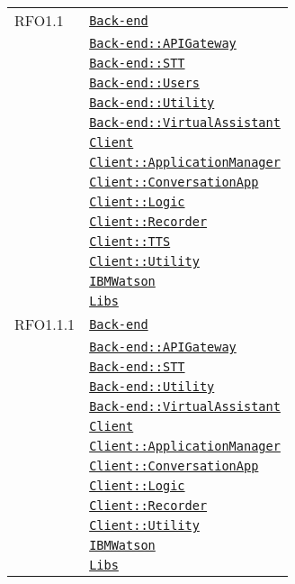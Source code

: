 \begin{longtable}{|>{\centering}m{3cm}|m{10cm}<{\centering}|}
RFO1.1 & \hyperref[Back-end]{\texttt{Back-end}}\\
& \hyperref[Back-end::APIGateway]{\texttt{Back-end::APIGateway}}\\
& \hyperref[Back-end::STT]{\texttt{Back-end::STT}}\\
& \hyperref[Back-end::Users]{\texttt{Back-end::Users}}\\
& \hyperref[Back-end::Utility]{\texttt{Back-end::Utility}}\\
& \hyperref[Back-end::VirtualAssistant]{\texttt{Back-end::VirtualAssistant}}\\
& \hyperref[Client]{\texttt{Client}}\\
& \hyperref[Client::ApplicationManager]{\texttt{Client::ApplicationManager}}\\
& \hyperref[Client::ConversationApp]{\texttt{Client::ConversationApp}}\\
& \hyperref[Client::Logic]{\texttt{Client::Logic}}\\
& \hyperref[Client::Recorder]{\texttt{Client::Recorder}}\\
& \hyperref[Client::TTS]{\texttt{Client::TTS}}\\
& \hyperref[Client::Utility]{\texttt{Client::Utility}}\\
& \hyperref[IBMWatson]{\texttt{IBMWatson}}\\
& \hyperref[Libs]{\texttt{Libs}}\\ \hline

RFO1.1.1 & \hyperref[Back-end]{\texttt{Back-end}}\\
& \hyperref[Back-end::APIGateway]{\texttt{Back-end::APIGateway}}\\
& \hyperref[Back-end::STT]{\texttt{Back-end::STT}}\\
& \hyperref[Back-end::Utility]{\texttt{Back-end::Utility}}\\
& \hyperref[Back-end::VirtualAssistant]{\texttt{Back-end::VirtualAssistant}}\\
& \hyperref[Client]{\texttt{Client}}\\
& \hyperref[Client::ApplicationManager]{\texttt{Client::ApplicationManager}}\\
& \hyperref[Client::ConversationApp]{\texttt{Client::ConversationApp}}\\
& \hyperref[Client::Logic]{\texttt{Client::Logic}}\\
& \hyperref[Client::Recorder]{\texttt{Client::Recorder}}\\
& \hyperref[Client::Utility]{\texttt{Client::Utility}}\\
& \hyperref[IBMWatson]{\texttt{IBMWatson}}\\
& \hyperref[Libs]{\texttt{Libs}}\\ \hline


\end{longtable}
